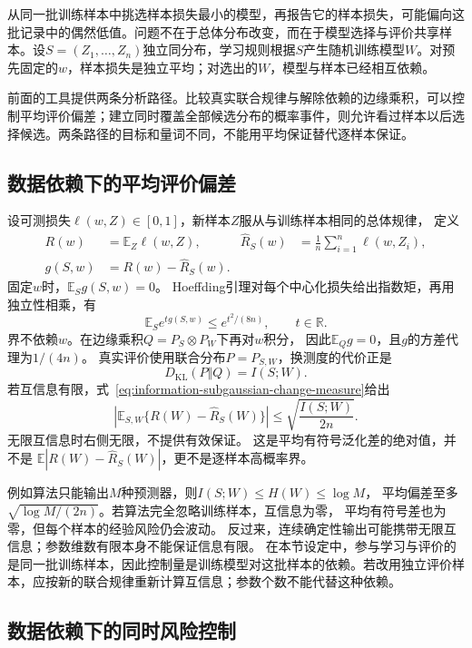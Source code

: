 从同一批训练样本中挑选样本损失最小的模型，再报告它的样本损失，可能偏向这批记录中的偶然低值。问题不在于总体分布改变，而在于模型选择与评价共享样本。设\(S=(Z_1,\ldots,Z_n)\)独立同分布，学习规则根据\(S\)产生随机训练模型\(W\)。对预先固定的\(w\)，样本损失是独立平均；对选出的\(W\)，模型与样本已经相互依赖。

前面的工具提供两条分析路径。比较真实联合规律与解除依赖的边缘乘积，可以控制平均评价偏差；建立同时覆盖全部候选分布的概率事件，则允许看过样本以后选择候选。两条路径的目标和量词不同，不能用平均保证替代逐样本保证。

\subsection{数据依赖下的平均评价偏差}
\label{sec:information-mi-generalization}

设可测损失\(\ell(w,Z)\in[0,1]\)，新样本\(Z\)服从与训练样本相同的总体规律，
定义
\[
  \begin{aligned}
    R(w)&=\mathbb E_Z\ell(w,Z),&
    \widehat R_S(w)&=\frac1n\sum_{i=1}^n\ell(w,Z_i),\\
    g(S,w)&=R(w)-\widehat R_S(w).
  \end{aligned}
\]
固定\(w\)时，\(\mathbb E_Sg(S,w)=0\)。
Hoeffding引理对每个中心化损失给出指数矩，再用独立性相乘，有
\[
  \mathbb E_Se^{t g(S,w)}\leq e^{t^2/(8n)},\qquad t\in\mathbb R.
\]
界不依赖\(w\)。在边缘乘积\(Q=P_S\otimes P_W\)下再对\(w\)积分，
因此\(\mathbb E_Qg=0\)，且\(g\)的方差代理为\(1/(4n)\)。
真实评价使用联合分布\(P=P_{S,W}\)，换测度的代价正是
\[
  D_{\mathrm{KL}}(P\Vert Q)=I(S;W).
\]
若互信息有限，式~\eqref{eq:information-subgaussian-change-measure}给出
\begin{equation}
  \left|\mathbb E_{S,W}\{R(W)-\widehat R_S(W)\}\right|
  \leq\sqrt{\frac{I(S;W)}{2n}}.
  \label{eq:information-mi-generalization}
\end{equation}
无限互信息时右侧无限，不提供有效保证。
这是平均有符号泛化差的绝对值，并不是
\(\mathbb E|R(W)-\widehat R_S(W)|\)，更不是逐样本高概率界。

例如算法只能输出\(M\)种预测器，则\(I(S;W)\leq H(W)\leq\log M\)，
平均偏差至多\(\sqrt{\log M/(2n)}\)。若算法完全忽略训练样本，互信息为零，
平均有符号差也为零，但每个样本的经验风险仍会波动。
反过来，连续确定性输出可能携带无限互信息；参数维数有限本身不能保证信息有限。
在本节设定中，参与学习与评价的是同一批训练样本，因此控制量是训练模型对这批样本的依赖。若改用独立评价样本，应按新的联合规律重新计算互信息；参数个数不能代替这种依赖。

\subsection{数据依赖下的同时风险控制}
\label{sec:information-pac-bayes}

